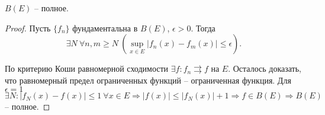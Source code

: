 \begin{theorem}
    $B(E)$ -- полное.
\end{theorem}

\begin{proof}
    Пусть $\{f_{n}\}$ фундаментальна в $B(E)$, $\epsilon > 0$. Тогда 
    \[\exists N \ \forall n, m \geq N \ (\sup_{x \in E} |f_{n}(x) - f_{m}(x)| \leq \epsilon).\]

    По критерию Коши равномерной сходимости $\exists f: f_{n} \rightrightarrows f$ на $E$. Осталось доказать, что равномерный предел ограниченных функций -- ограниченная функция. Для $\epsilon = 1$ $\exists N: |f_{N}(x) - f(x)| \leq 1 \ \forall x \in E \Rightarrow |f(x)| \leq |f_{N}(x)| + 1 \Rightarrow f \in B(E) \Rightarrow B(E)$ -- полное.
\end{proof}
